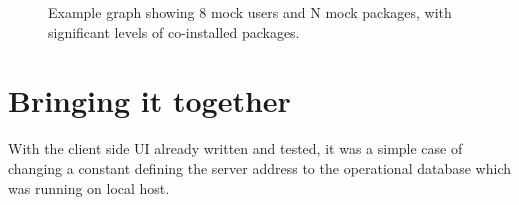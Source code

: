 \documentclass{l4proj}
\begin{document}
\begin{figure}
\caption{Example graph showing 8 mock users and N mock packages, with significant levels of co-installed packages.}
\end{figure}

\section{Bringing it together}
With the client side UI already written and tested, it was a simple case of changing a constant defining the server address to the operational database which was running on local host.
\end{document}
